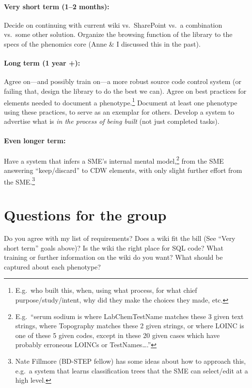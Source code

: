 \documentclass{tufte-handout}
\begin{document}
\paragraph{Very short term (1--2 months):}
Decide on continuing with current wiki vs.\ SharePoint vs.\ a
combination vs.\ some other solution. Organize the browsing function
of the library to the specs of the phenomics core (Anne \& I discussed this
in the past).

\paragraph{Long term (1 year +):}
Agree on---and possibly train on---a more robust source code control
system (or failing that, design the library to do the best we can). Agree
on best practices for elements needed to document a
phenotype.\footnote{E.g.\ who built this, when, using what process, for what
  chief purpose/study/intent, why did they make the choices they made,
  etc.} Document at least one phenotype using these practices, to
serve as an exemplar for others. Develop a system to advertise what is
\emph{in the process of being built} (not just completed tasks).

\paragraph{Even longer term:}
Have a system that infers a SME's internal mental
model,\footnote{E.g.\ ``serum sodium is where LabChemTestName matches
  these 3 given text strings, where Topography matches these
  2 given strings, or where LOINC is one of these 5 given codes,
  except in these 20 given cases which have probably erroneous
  LOINCs or TestNames\ldots{}.''} from the SME answering
``keep/discard'' to CDW elements, with only slight further effort from
the SME.\footnote{Nate Fillmore (BD-STEP fellow) has some ideas about how to approach this,
  e.g.\ a system that learns classification trees that the SME can
  select/edit at a high level.}

\section{Questions for the group}

Do you agree with my list of requirements? Does a wiki fit the bill
(See ``Very short term'' goals above)?
Is the wiki the right place for SQL code? What training or further information on the wiki do
you want? What should be captured about each phenotype?
\end{document}
